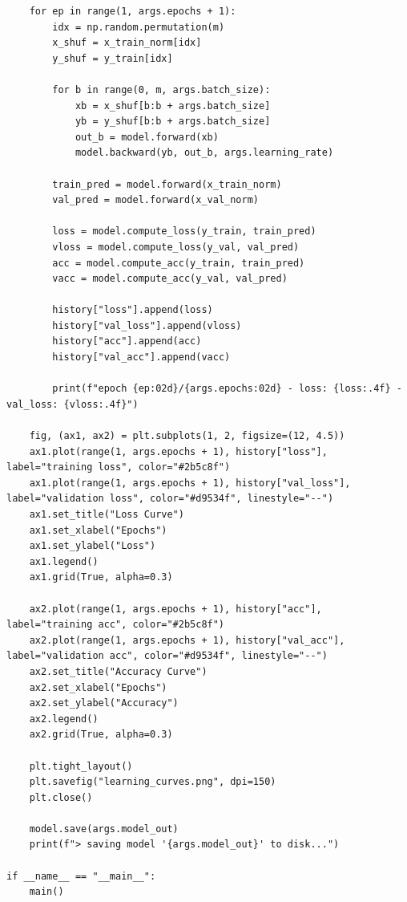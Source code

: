 \documentclass[a4paper,14pt]{extarticle}
\begin{document}
\begin{lstlisting}
    for ep in range(1, args.epochs + 1):
        idx = np.random.permutation(m)
        x_shuf = x_train_norm[idx]
        y_shuf = y_train[idx]

        for b in range(0, m, args.batch_size):
            xb = x_shuf[b:b + args.batch_size]
            yb = y_shuf[b:b + args.batch_size]
            out_b = model.forward(xb)
            model.backward(yb, out_b, args.learning_rate)

        train_pred = model.forward(x_train_norm)
        val_pred = model.forward(x_val_norm)

        loss = model.compute_loss(y_train, train_pred)
        vloss = model.compute_loss(y_val, val_pred)
        acc = model.compute_acc(y_train, train_pred)
        vacc = model.compute_acc(y_val, val_pred)

        history["loss"].append(loss)
        history["val_loss"].append(vloss)
        history["acc"].append(acc)
        history["val_acc"].append(vacc)

        print(f"epoch {ep:02d}/{args.epochs:02d} - loss: {loss:.4f} - val_loss: {vloss:.4f}")

    fig, (ax1, ax2) = plt.subplots(1, 2, figsize=(12, 4.5))
    ax1.plot(range(1, args.epochs + 1), history["loss"], label="training loss", color="#2b5c8f")
    ax1.plot(range(1, args.epochs + 1), history["val_loss"], label="validation loss", color="#d9534f", linestyle="--")
    ax1.set_title("Loss Curve")
    ax1.set_xlabel("Epochs")
    ax1.set_ylabel("Loss")
    ax1.legend()
    ax1.grid(True, alpha=0.3)

    ax2.plot(range(1, args.epochs + 1), history["acc"], label="training acc", color="#2b5c8f")
    ax2.plot(range(1, args.epochs + 1), history["val_acc"], label="validation acc", color="#d9534f", linestyle="--")
    ax2.set_title("Accuracy Curve")
    ax2.set_xlabel("Epochs")
    ax2.set_ylabel("Accuracy")
    ax2.legend()
    ax2.grid(True, alpha=0.3)

    plt.tight_layout()
    plt.savefig("learning_curves.png", dpi=150)
    plt.close()

    model.save(args.model_out)
    print(f"> saving model '{args.model_out}' to disk...")

if __name__ == "__main__":
    main()
\end{lstlisting}
\end{document}

